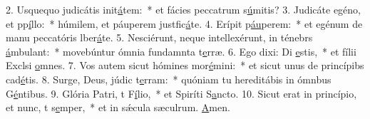 2. Usquequo judicátis init\uline{á}tem:~* et fácies peccatrum s\uline{ú}mitis?
3. Judicáte egéno, et pp\uline{í}llo:~* húmilem, et páuperem justfic\uline{á}te.
4. Erípit p\uline{áu}perem:~* et egénum de manu peccatóris lber\uline{á}te.
5. Nesciérunt, neque intellexérunt, in ténebrs \uline{á}mbulant:~* movebúntur ómnia fundamnta t\uline{e}rræ.
6. Ego dixi: Di \uline{e}stis,~* et fílii Exclsi \uline{o}mnes.
7. Vos autem sicut hómines mor\uline{é}mini:~* et sicut unus de princípibs cad\uline{é}tis.
8. Surge, Deus, júdic t\uline{e}rram:~* quóniam tu hereditábis in ómnbus G\uline{é}ntibus.
9. Glória Patri, t F\uline{í}lio,~* et Spiríti S\uline{a}ncto.
10. Sicut erat in princípio, et nunc, t s\uline{e}mper,~* et in sǽcula sæculrum. \uline{A}men.
